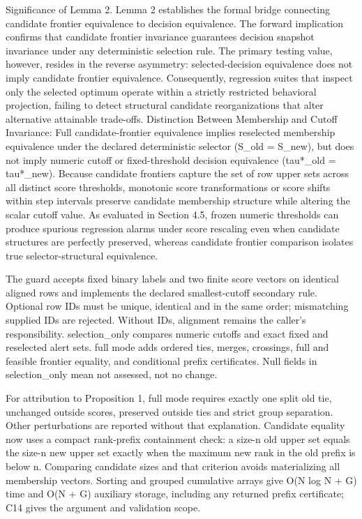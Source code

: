 \documentclass[11pt,a4paper]{article}
\begin{document}
Significance of Lemma 2. Lemma 2 establishes the formal bridge connecting candidate frontier equivalence to decision equivalence. The forward implication confirms that candidate frontier invariance guarantees decision snapshot invariance under any deterministic selection rule. The primary testing value, however, resides in the reverse asymmetry: selected-decision equivalence does not imply candidate frontier equivalence. Consequently, regression suites that inspect only the selected optimum operate within a strictly restricted behavioral projection, failing to detect structural candidate reorganizations that alter alternative attainable trade-offs. Distinction Between Membership and Cutoff Invariance: Full candidate-frontier equivalence implies reselected membership equivalence under the declared deterministic selector (S\_old = S\_new), but does not imply numeric cutoff or fixed-threshold decision equivalence (tau*\_old = tau*\_new). Because candidate frontiers capture the set of row upper sets across all distinct score thresholds, monotonic score transformations or score shifts within step intervals preserve candidate membership structure while altering the scalar cutoff value. As evaluated in Section 4.5, frozen numeric thresholds can produce spurious regression alarms under score rescaling even when candidate structures are perfectly preserved, whereas candidate frontier comparison isolates true selector-structural equivalence.

The guard accepts fixed binary labels and two finite score vectors on identical aligned rows and implements the declared smallest-cutoff secondary rule. Optional row IDs must be unique, identical and in the same order; mismatching supplied IDs are rejected. Without IDs, alignment remains the caller's responsibility. selection\_only compares numeric cutoffs and exact fixed and reselected alert sets. full mode adds ordered ties, merges, crossings, full and feasible frontier equality, and conditional prefix certificates. Null fields in selection\_only mean not assessed, not no change.

For attribution to Proposition 1, full mode requires exactly one split old tie, unchanged outside scores, preserved outside ties and strict group separation. Other perturbations are reported without that explanation. Candidate equality now uses a compact rank-prefix containment check: a size-n old upper set equals the size-n new upper set exactly when the maximum new rank in the old prefix is below n. Comparing candidate sizes and that criterion avoids materializing all membership vectors. Sorting and grouped cumulative arrays give O(N log N + G) time and O(N + G) auxiliary storage, including any returned prefix certificate; C14 gives the argument and validation scope.
\end{document}
